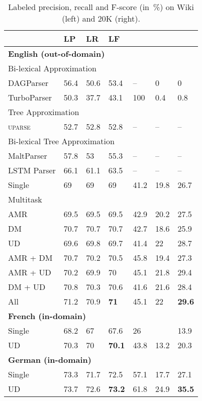 \documentclass[12pt]{report}
\begin{document}
\begin{table}[t]
\begin{subfigure}[t]{.475\textwidth}
\begin{tabular}{l|lll|lll}
& \textbf{LP} & \textbf{LR} & \textbf{LF} \\
\hline
\multicolumn{4}{l|}{\bf English (out-of-domain)} \\
\multicolumn{4}{l|}{\rule{0pt}{2ex}
Bi-lexical Approximation} \\
DAGParser
& 56.4 & 50.6 & 53.4 & -- & 0 & 0 \\
TurboParser
& 50.3 & 37.7 & 43.1 & 100 & 0.4 & 0.8 \\
\hline
\multicolumn{4}{l|}{\rule{0pt}{2ex}
Tree Approximation} \\
\textsc{uparse}
& 52.7 & 52.8 & 52.8 & -- & -- & -- \\
\hline
\multicolumn{4}{l|}{\rule{0pt}{2ex}
Bi-lexical Tree Approximation} \\
MaltParser
& 57.8 & 53 & 55.3 & -- & -- & -- \\
LSTM Parser
& 66.1 & 61.1 & 63.5 & -- & -- & -- \\
\hline
Single
& 69 & 69 & 69 & 41.2 & 19.8 & 26.7 \\
Multitask &&& \\
AMR
& 69.5 & 69.5 & 69.5 & 42.9 & 20.2 & 27.5 \\
DM
& 70.7 & 70.7 & 70.7 & 42.7 & 18.6 & 25.9 \\
UD
& 69.6 & 69.8 & 69.7 & 41.4 & 22 & 28.7 \\
AMR + DM
& 70.7 & 70.2 & 70.5 & 45.8 & 19.4 & 27.3 \\
AMR + UD
& 70.2 & 69.9 & 70 & 45.1 & 21.8 & 29.4 \\
DM + UD
& 70.8 & 70.3 & 70.6 & 41.6 & 21.6 & 28.4 \\
All
& 71.2 & 70.9 & \textbf{71} & 45.1 & 22 & \textbf{29.6} \\
\hline
\multicolumn{4}{l|}{\bf French (in-domain)} & \\
Single & 68.2 & 67 & 67.6 & 26 & \enskip 9.4 & 13.9 \\
UD & 70.3 & 70 & \textbf{70.1} & 43.8 & 13.2 & 20.3 \\
\hline
\multicolumn{4}{l|}{\bf German (in-domain)} & \\
Single & 73.3 & 71.7 & 72.5 & 57.1 & 17.7 & 27.1 \\
UD & 73.7 & 72.6 & \textbf{73.2} & 61.8 & 24.9 & \textbf{35.5}
\end{tabular}\label{tab:ood_results}
\end{subfigure}
\caption{
Labeled precision, recall and F-score (in~\%)
on Wiki (left) and 20K (right).
}\label{tab:results}
\end{table}
\end{document}
